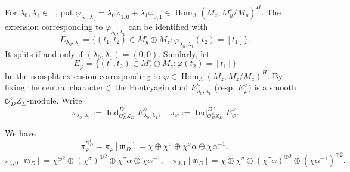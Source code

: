 \documentclass[11pt,a4paper]{article} %
\def\FF{\mathbb{F}}
\def\cO{\mathcal{O}}
\def\Hom{\operatorname{Hom}}
\def\Ind{\operatorname{Ind}}
\begin{document}
For $\lambda_0,\lambda_1\in\FF$, put $\varphi_{\lambda_0,\lambda_1}=\lambda_0\varphi_{1,0}+\lambda_1\varphi_{0,1}\in\Hom_{\Lambda}(M_z,M_y^\circ/M_y)^H$. The extension corresponding to $\varphi_{\lambda_0,\lambda_1}$ can be identified with
\[
E_{\lambda_0,\lambda_1}=\{(t_1,t_2)\in M_y^\circ\oplus M_z:\varphi_{\lambda_0,\lambda_1}(t_2)=[t_1]\}.
\]
It splits if and only if $(\lambda_0,\lambda_1)=(0,0)$. Similarly, let
\[
E_\varphi=\{(t_1,t_2)\in M_z^\circ\oplus M_z:\varphi(t_2)=[t_1]\}
\]
be the nonsplit extension corresponding to $\varphi\in\Hom_{\Lambda}(M_z,M_z^\circ/M_z)^H$. By fixing the central character $\zeta$, the Pontryagin dual $E_{\lambda_0,\lambda_1}^\vee$ (resp. $E_\varphi^\vee$) is a smooth $\cO_D^{\times}Z_D$-module. Write
\[
\pi_{\lambda_0,\lambda_1}:=\Ind_{\cO_D^{\times}Z_D}^{D^\times}E_{\lambda_0,\lambda_1}^\vee,\quad\pi_\varphi:=\Ind_{\cO_D^{\times}Z_D}^{D^\times}E_\varphi^\vee.
\]

\begin{proposition}
      We have 
      \[
      \pi_\varphi^{U_D^1}=\pi_\varphi[\mathfrak{m}_D]=\chi\oplus\chi^\sigma\oplus\chi^\sigma\alpha\oplus\chi\alpha^{-1},
      \]
      \[
      \pi_{1,0}[\mathfrak{m}_D]=\chi^{\oplus2}\oplus(\chi^\sigma)^{\oplus2}\oplus\chi^\sigma\alpha\oplus\chi\alpha^{-1},\quad\pi_{0,1}[\mathfrak{m}_D]=\chi\oplus\chi^\sigma\oplus(\chi^\sigma\alpha)^{\oplus2}\oplus(\chi\alpha^{-1})^{\oplus2}.
      \]
\end{proposition}
\end{document}
